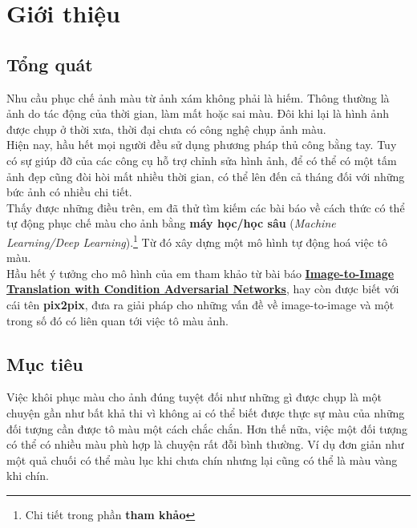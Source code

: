 \documentclass[a4paper]{article}
\begin{document}
\newpage

\renewcommand{\listfigurename}{Danh sách hình minh hoạ}
\listoffigures

\newpage

\fancyfoot[R]{\scriptsize \ttfamily {\thepage}/\pageref{LastPage}}

\section{Giới thiệu}

\subsection{Tổng quát}
Nhu cầu phục chế ảnh màu từ ảnh xám không phải là hiếm. Thông thường là ảnh do tác động của thời gian, làm mất hoặc sai màu. Đôi khi lại là hình ảnh được chụp ở thời xưa, thời đại chưa có công nghệ chụp ảnh màu.\\
Hiện nay, hầu hết mọi người đều sử dụng phương pháp thủ công bằng tay. Tuy có sự giúp đỡ của các công cụ hỗ trợ chỉnh sửa hình ảnh, để có thể có một tấm ảnh đẹp cũng đòi hòi mất nhiều thời gian, có thể lên đến cả tháng đối với những bức ảnh có nhiều chi tiết.\\

\noindent
Thấy được những điều trên, em đã thử tìm kiếm các bài báo về cách thức có thể tự động phục chế màu cho ảnh bằng \textbf{máy học/học sâu} (\textit{Machine Learning/Deep Learning}).\footnote{Chi tiết trong phần \textbf{ tham khảo}} Từ đó xây dựng một mô hình tự động hoá việc tô màu.\\
Hầu hết ý tưởng cho mô hình của em tham khảo từ bài báo \href{https://arxiv.org/abs/1611.07004}{\textbf{Image-to-Image Translation with Condition Adversarial Networks}}, hay còn được biết với cái tên \textbf{pix2pix}, đưa ra giải pháp cho những vấn đề về image-to-image và một trong số đó có liên quan tới việc tô màu ảnh. 

\subsection{Mục tiêu}\label{objective}
Việc khôi phục màu cho ảnh đúng tuyệt đối như những gì được chụp là một chuyện gần như bất khả thi vì không ai có thể biết được thực sự màu của những đối tượng cần được tô màu một cách chắc chắn. Hơn thế nữa, việc một đối tượng có thể có nhiều màu phù hợp là chuyện rất đỗi bình thường. Ví dụ đơn giản như một quả chuối có thể màu lục khi chưa chín nhưng lại cũng có thể là màu vàng khi chín.
\end{document}
